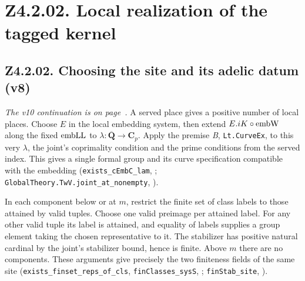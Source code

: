 \section*{Z4.2.02. Local realization of the tagged kernel}

\subsection{Z4.2.02. Choosing the site and its adelic datum (v8)}\label{r6:Z4.2.02}
\emph{The v10 continuation is on page~\pageref{r8:Z4.2.02}.}
A served place gives a positive number of local places. Choose \(E\) in the local embedding system, then extend \(E.iK\circ{\rm embW}\) along the fixed \({\rm embLL}\) to \(\lambda:\overline{\mathbf Q}\to\mathbf C_p\). Apply the premise \emph{B}, \nolinkurl{Lt.CurveEx}, to this very \(\lambda\), the joint's coprimality condition and the prime conditions from the served index. This gives a single formal group and its curve specification compatible with the embedding (\nolinkurl{exists_cEmbC_lam}, ; \nolinkurl{GlobalTheory.TwV.joint_at_nonempty}, ).

In each component below or at \(m\), restrict the finite set of class labels to those attained by valid tuples. Choose one valid preimage per attained label. For any other valid tuple its label is attained, and equality of labels supplies a group element taking the chosen representative to it. The stabilizer has positive natural cardinal by the joint's stabilizer bound, hence is finite. Above \(m\) there are no components. These arguments give precisely the two finiteness fields of the same site (\nolinkurl{exists_finset_reps_of_cls}, \nolinkurl{finClasses_sysS}, ; \nolinkurl{finStab_site}, ).

